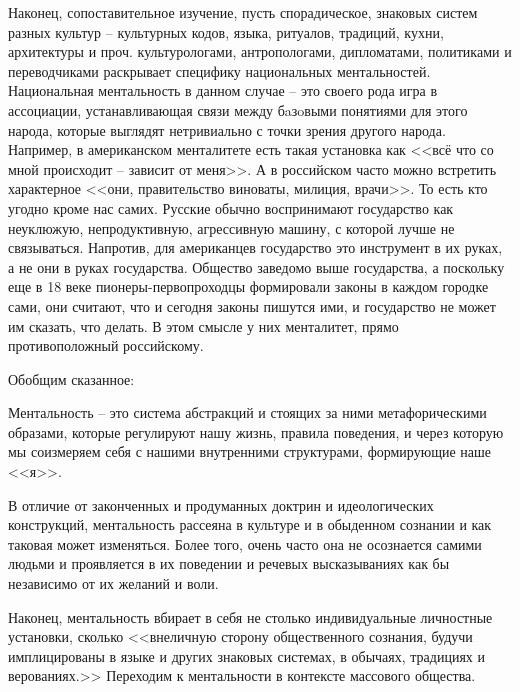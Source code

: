Наконец, сопоставительное изучение, пусть спорадическое, знаковых систем разных культур -- культурных кодов,
языка, ритуалов, традиций, кухни, архитектуры и проч. культурологами, антропологами, дипломатами,
политиками и переводчиками раскрывает специфику национальных ментальностей. Национальная ментальность
в данном случае -- это своего рода игра в ассоциации, устанавливающая связи между бaзoвыми понятиями
для этого народа, которые выглядят нетривиально с точки зрения другого народа.
Например, в американском менталитете есть такая установка как <<всё что со мной происходит -- зависит от меня>>.
А в российском часто можно встретить характерное <<они, правительство виноваты, милиция, врачи>>.
То есть кто угодно кроме нас самих. Русские обычно воспринимают государство как неуклюжую, непродуктивную,
агрессивную машину, с которой лучше не связываться. Напротив, для американцев государство это инструмент в
их руках, а не они в руках государства. Общество заведомо выше государства, а поскольку еще в 18 веке
пионеры-первопроходцы формировали законы в каждом городке сами, они считают, что и сегодня законы пишутся
ими, и государство не может им сказать, что делать. В этом смысле у них менталитет, прямо
противоположный российскому.

Обобщим сказанное:

Ментальность -- это система абстракций и стоящих за ними метафорическими образами,
которые регулируют нашу жизнь, правила поведения, и через которую мы соизмеряем себя
с нашими внутренними структурами, формирующие наше <<я>>.

В отличие от законченных и продуманных доктрин и идеологических конструкций, ментальность
рассеяна в культуре и в обыденном сознании и как таковая может изменяться.
Более того, очень часто она не осознается самими людьми и проявляется в их поведении
и речевых высказываниях как бы независимо от их желаний и воли.

Наконец, ментальность вбирает в себя не столько индивидуальные личностные установки,
сколько <<внеличную сторону общественного сознания, будучи имплицированы в языке и
других знаковых системах, в обычаях, традициях и верованиях.>>\autocite{gurevich_history} Переходим к ментальности в контексте массового общества.

